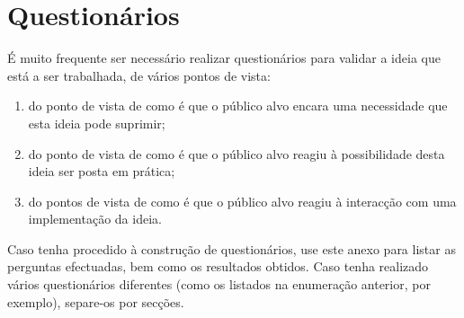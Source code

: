 \chapter{Questionários}
\label{chap:zb}

É muito frequente ser necessário realizar questionários para validar a ideia que está a ser trabalhada, de vários pontos de vista:

\begin{enumerate}
    \item do ponto de vista de como é que o público alvo encara uma necessidade que esta ideia pode suprimir;
    \item do ponto de vista de como é que o público alvo reagiu à possibilidade desta ideia ser posta em prática;
    \item do pontos de vista de como é que o público alvo reagiu à interacção com uma implementação da ideia.
\end{enumerate}

Caso tenha procedido à construção de questionários, use este anexo para listar as perguntas efectuadas, bem como os resultados obtidos. Caso tenha realizado vários questionários diferentes (como os listados na enumeração anterior, por exemplo), separe-os por secções.